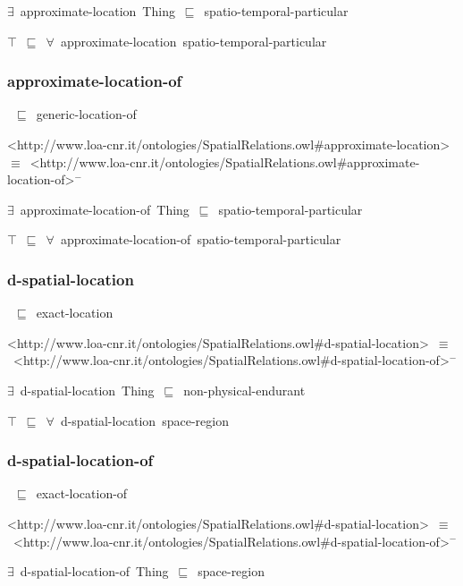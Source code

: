 \documentclass{article}
\begin{document}
\ensuremath{\exists}~approximate-location~Thing~\ensuremath{\sqsubseteq}~spatio-temporal-particular

\ensuremath{\top}~\ensuremath{\sqsubseteq}~\ensuremath{\forall}~approximate-location~spatio-temporal-particular

\subsubsection*{approximate-location-of}

~\ensuremath{\sqsubseteq}~generic-location-of

<http://www.loa-cnr.it/ontologies/SpatialRelations.owl#approximate-location>~\ensuremath{\equiv}~<http://www.loa-cnr.it/ontologies/SpatialRelations.owl#approximate-location-of>\ensuremath{^-}

\ensuremath{\exists}~approximate-location-of~Thing~\ensuremath{\sqsubseteq}~spatio-temporal-particular

\ensuremath{\top}~\ensuremath{\sqsubseteq}~\ensuremath{\forall}~approximate-location-of~spatio-temporal-particular

\subsubsection*{d-spatial-location}

~\ensuremath{\sqsubseteq}~exact-location

<http://www.loa-cnr.it/ontologies/SpatialRelations.owl#d-spatial-location>~\ensuremath{\equiv}~<http://www.loa-cnr.it/ontologies/SpatialRelations.owl#d-spatial-location-of>\ensuremath{^-}

\ensuremath{\exists}~d-spatial-location~Thing~\ensuremath{\sqsubseteq}~non-physical-endurant

\ensuremath{\top}~\ensuremath{\sqsubseteq}~\ensuremath{\forall}~d-spatial-location~space-region

\subsubsection*{d-spatial-location-of}

~\ensuremath{\sqsubseteq}~exact-location-of

<http://www.loa-cnr.it/ontologies/SpatialRelations.owl#d-spatial-location>~\ensuremath{\equiv}~<http://www.loa-cnr.it/ontologies/SpatialRelations.owl#d-spatial-location-of>\ensuremath{^-}

\ensuremath{\exists}~d-spatial-location-of~Thing~\ensuremath{\sqsubseteq}~space-region
\end{document}
